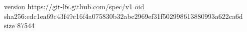 version https://git-lfs.github.com/spec/v1
oid sha256:edc1ea69c43f49c16f4a075830b32abc2969ef31f502998613880993a622ca6d
size 87544

